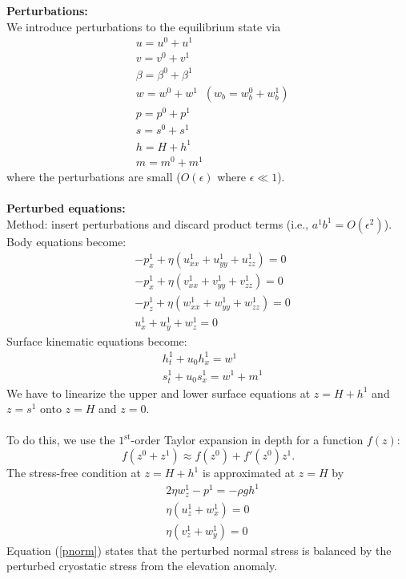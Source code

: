 \documentclass[paper=a4, fontsize=11pt]{article}
\begin{document}
\noindent\textbf{Perturbations:}\\
We introduce perturbations to the equilibrium state via
\begin{align}
&u= u^0 +  u^1 \\
&v= v^0 +  v^1 \\
&\beta = \beta^0 + \beta^1 \\
&w =  w^0 + w^1 \;\; (w_b=w_b^0 + w_b^1)\\
&p = p^0 +  p^1\\
&s =  s^0 + s^1 \\
&h = H +  h^1 \\
&m = m^0 + m^1
\end{align}
where the perturbations are small ($O(\epsilon)$ where $\epsilon \ll 1$). \\ \\
\noindent\textbf{Perturbed equations:}\\
Method: insert perturbations and discard product terms (i.e., $a^1b^1=O(\epsilon^2)$).\\
Body equations become:
\begin{align}
&-p_x^1 + \eta (u_{xx}^1 +u_{yy}^1+ u_{zz}^1) = 0 \\
&-p_x^1 + \eta (v_{xx}^1 +v_{yy}^1+ v_{zz}^1) = 0 \\
&-p_z^1 + \eta (w_{xx}^1 +w_{yy}^1+ w_{zz}^1) = 0\\
&u_x^1 + u_y^1 + w_z^1 = 0
\end{align}
Surface kinematic equations become:
\begin{align}
&h_t^1 + u_0 h_x^1  = w^1 \label{ht} \\
&s_t^1  + u_0 s_x^1 = w^1 + m^1 \label{st}
\end{align}
We have to linearize the upper and lower surface equations at $z=H +  h^1$
and $z= s^1$ onto $z=H$ and $z=0$.
\\ \\
To do this, we
use the $1^\mathrm{st}$-order Taylor expansion in depth for a function $f(z)$:
$$ f(z^0 + z^1) \approx f(z^0) + f'(z^0)z^1. $$
The stress-free condition at $z=H+h^1$ is approximated at $z=H$ by
\begin{align}
&2\eta w_z^1 - p^1 = -\rho g h^1 \label{pnorm} \\
&\eta(u_z^1 +w_x^1) = 0 \\
&\eta(v_z^1 +w_y^1) = 0
\end{align}
Equation (\ref{pnorm}) states that the perturbed normal stress is balanced
by the perturbed cryostatic stress from the elevation anomaly.
\\ \\
\end{document}
